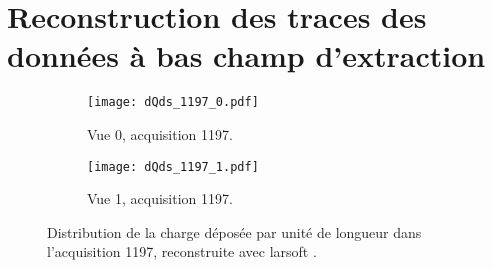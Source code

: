 %
%

  \section{Reconstruction des traces des données à bas champ d'extraction}\label{sec::rawdatasoft}

    \begin{figure}[htbp]
      \centering
      \begin{subfigure}[t]{0.48\textwidth}
        \centering
        \texttt{[image: dQds\_1197\_0.pdf]}
        \caption{Vue 0, acquisition 1197.}
      \end{subfigure}\hfill
      \begin{subfigure}[t]{0.48\textwidth}
        \centering
        \texttt{[image: dQds\_1197\_1.pdf]}
        \caption{Vue 1, acquisition 1197.}
      \end{subfigure}
      \caption[Distribution de la charge déposée par unité de longueur dans le \TOO{}]{\label{fig::dqds_1197}Distribution de la charge déposée par unité de longueur dans l'acquisition 1197, reconstruite avec \gls{larsoft} .}
    \end{figure}

